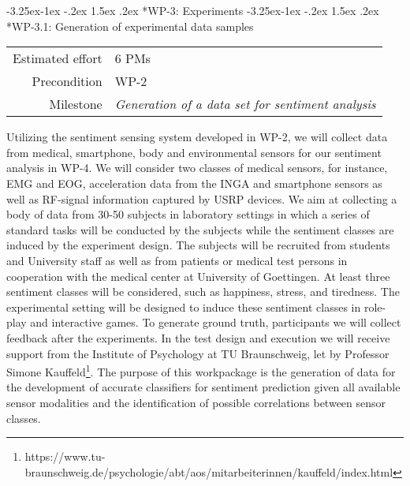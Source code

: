 \documentclass[12pt]{article}
\makeatletter
\newcommand{\kobyc}[1]{\begin{center}\fbox{\parbox{3in}{{\textcolor{green}{K: #1}}}}\end{center}}
\renewcommand\paragraph{\@startsection{paragraph}{4}{\z@}%
  {-3.25ex\@plus -1ex \@minus -.2ex}%
  {1.5ex \@plus .2ex}%
  {\normalfont\normalsize\bfseries}}
\makeatother
\begin{document}
\paragraph*{WP-3: Experiments}
\paragraph*{WP-3.1: Generation of experimental data samples}
\begin{tabular}{rl}
 Estimated effort& 6 PMs\\
 Precondition & WP-2\\
 Milestone & \begin{minipage}[t]{12.2cm}
\textit{Generation of a data set for sentiment analysis}\vspace{.2cm}
             \end{minipage}
\end{tabular}

\noindent
Utilizing the sentiment sensing system developed in WP-2, we will collect data from medical, smartphone, body and environmental sensors for our sentiment analysis in WP-4. 
We will consider two classes of medical sensors, for instance, EMG and EOG, acceleration data from the INGA and smartphone sensors as well as RF-signal information captured by USRP devices. 
We aim at collecting a body of data from 30-50 subjects in laboratory settings in which a series of standard tasks will be conducted by the subjects while the sentiment classes are induced by the experiment design. 
The subjects will be recruited from students and University staff as well as from patients or medical test persons in cooperation with the medical center at University of Goettingen.
At least three sentiment classes will be considered, such as happiness, stress, and tiredness. 
The experimental setting will be designed to induce these sentiment classes in role-play and interactive games.
To generate ground truth, participants we will collect feedback after the experiments. 
In the test design and execution we will receive support from the Institute of Psychology at TU Braunschweig, let by Professor Simone Kauffeld\footnote{https://www.tu-braunschweig.de/psychologie/abt/aos/mitarbeiterinnen/kauffeld/index.html}.
The purpose of this workpackage is the generation of data for the development of accurate classifiers for sentiment prediction given all available sensor modalities and the identification of possible correlations between sensor classes.
\end{document}

